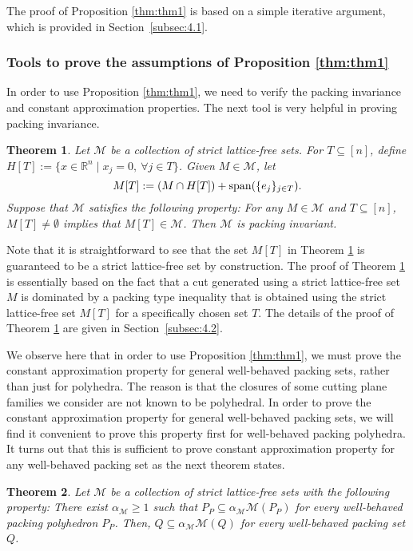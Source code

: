\documentclass[11pt]{article}
\newcommand{\R}{\mathbb{R}}
\newcommand{\seq}{\subseteq}
\newcommand{\Mset}{M}
\newcommand{\M}{\mathcal{\Mset}}
\newcommand{\Tset}{T}
\newtheorem{theorem}{Theorem}
\newcommand{\cred}{\color{black}}
\def\spann{\mathop{\rm span}}
\begin{document}
The proof of Proposition \ref{thm:thm1} is based on a simple iterative argument, which is provided in Section~\ref{subsec:4.1}. 

\subsubsection{Tools to prove the assumptions of Proposition \ref{thm:thm1}}
In order to use Proposition \ref{thm:thm1}, we need to verify the packing invariance and constant approximation properties. The next tool is very helpful in proving packing invariance.

\begin{theorem}
\label{thm:thm2}
Let $\M$ be a collection of strict lattice-free sets. For $\Tset \seq [n]$, define $H[\Tset] := \{ x \in \R^n \mid x_j = 0, \ \forall j \in T\}$. Given $\Mset \in \M$, let 
$$M[\Tset] := ( M \cap H[\Tset] ) + \spann ( \{ e_{j} \}_{j \in T} ). $$ 
Suppose that $\M$ satisfies the following property: For any $\Mset \in \M$ and $T \seq [n]$, $M[\Tset] \neq \emptyset$ implies that $M[\Tset] \in \M$. Then $\M$ is packing invariant. 
\end{theorem}

Note that it is straightforward to see that the set $\Mset[T]$ in Theorem \ref{thm:thm2} is guaranteed to be a strict lattice-free set by construction. The proof of Theorem \ref{thm:thm2} is essentially based on the fact that a cut generated using a strict lattice-free set $M$ is dominated by a packing type inequality that is obtained using the strict lattice-free set $M[T]$ for a specifically chosen set $T$. The details of the proof of Theorem \ref{thm:thm2} are given in Section~\ref{subsec:4.2}.

We observe here that in order to use Proposition \ref{thm:thm1}, we must prove {\cred the} constant approximation property for general well-behaved packing sets, rather than just for polyhedra. The reason is that the closures of some cutting plane families we consider are not known to be polyhedral. In order to prove  {\cred the} constant approximation property for general well-behaved packing sets, we will find it convenient to prove this property first for well-behaved packing polyhedra. It turns out that this is sufficient to prove constant approximation property for any well-behaved packing set as the next theorem states.

\begin{theorem}
\label{thm:thm3}
Let $\M$ be a collection of strict lattice-free sets with the following property: There exist $\alpha_\M \geq 1$ such that $P_P \seq \alpha_\M \M(P_P)$ for every well-behaved packing polyhedron $P_P$. Then, $Q \seq \alpha_\M \M(Q)$ for every well-behaved packing set $Q$.
\end{theorem}
\end{document}
